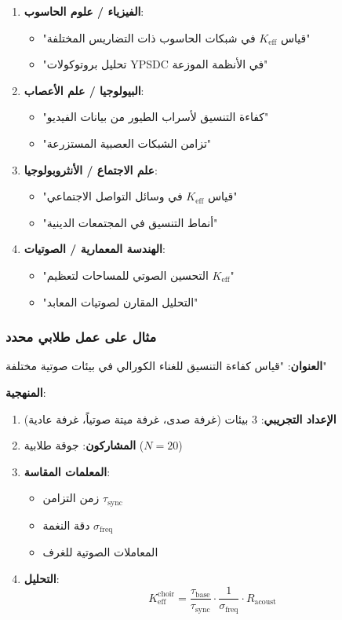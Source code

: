 \documentclass[12pt,a4paper]{article}
\begin{document}
	\begin{enumerate}
		\item \textbf{الفيزياء / علوم الحاسوب}:
		\begin{itemize}
			\item "قياس \(K_{\mathrm{eff}}\) في شبكات الحاسوب ذات التضاريس المختلفة"
			\item "تحليل بروتوكولات YPSDC في الأنظمة الموزعة"
		\end{itemize}
		
		\item \textbf{البيولوجيا / علم الأعصاب}:
		\begin{itemize}
			\item "كفاءة التنسيق لأسراب الطيور من بيانات الفيديو"
			\item "تزامن الشبكات العصبية المستزرعة"
		\end{itemize}
		
		\item \textbf{علم الاجتماع / الأنثروبولوجيا}:
		\begin{itemize}
			\item "قياس \(K_{\mathrm{eff}}\) في وسائل التواصل الاجتماعي"
			\item "أنماط التنسيق في المجتمعات الدينية"
		\end{itemize}
		
		\item \textbf{الهندسة المعمارية / الصوتيات}:
		\begin{itemize}
			\item "التحسين الصوتي للمساحات لتعظيم \(K_{\mathrm{eff}}\)"
			\item "التحليل المقارن لصوتيات المعابد"
		\end{itemize}
	\end{enumerate}
	
	\subsubsection{مثال على عمل طلابي محدد}
	
	\textbf{العنوان}: "قياس كفاءة التنسيق للغناء الكورالي في بيئات صوتية مختلفة"
	
	\textbf{المنهجية}:
	\begin{enumerate}
		\item \textbf{الإعداد التجريبي}: 3 بيئات (غرفة صدى، غرفة ميتة صوتياً، غرفة عادية)
		\item \textbf{المشاركون}: جوقة طلابية ($N=20$)
		\item \textbf{المعلمات المقاسة}:
		\begin{itemize}
			\item زمن التزامن $\tau_{\mathrm{sync}}$
			\item دقة النغمة $\sigma_{\mathrm{freq}}$
			\item المعاملات الصوتية للغرف
		\end{itemize}
		\item \textbf{التحليل}:
		\[
		K_{\mathrm{eff}}^{\mathrm{choir}} = \frac{\tau_{\mathrm{base}}}{\tau_{\mathrm{sync}}} \cdot \frac{1}{\sigma_{\mathrm{freq}}} \cdot R_{\mathrm{acoust}}
		\]
	\end{enumerate}
	
\end{document}
